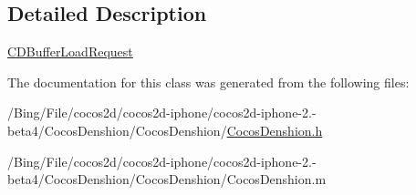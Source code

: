 \subsection{Detailed Description}
\hyperlink{interface_c_d_buffer_load_request}{C\-D\-Buffer\-Load\-Request} 

The documentation for this class was generated from the following files\-:\begin{DoxyCompactItemize}
\item 
/\-Bing/\-File/cocos2d/cocos2d-\/iphone/cocos2d-\/iphone-\/2.-\/beta4/\-Cocos\-Denshion/\-Cocos\-Denshion/\hyperlink{_cocos_denshion_8h}{Cocos\-Denshion.\-h}\item 
/\-Bing/\-File/cocos2d/cocos2d-\/iphone/cocos2d-\/iphone-\/2.-\/beta4/\-Cocos\-Denshion/\-Cocos\-Denshion/Cocos\-Denshion.\-m\end{DoxyCompactItemize}

